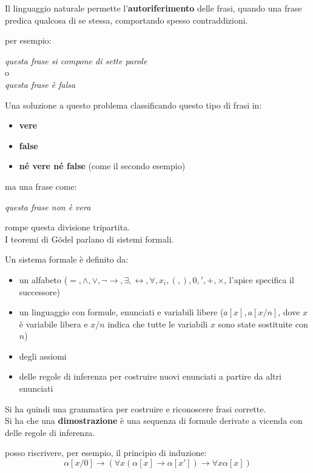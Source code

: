 \documentclass[a4paper,12pt, oneside]{book}
\begin{document}
Il linguaggio naturale permette l'\textbf{autoriferimento} delle frasi, quando
una frase predica qualcosa di se stessa, comportando spesso contraddizioni.
\begin{esempio}
  per esempio:
  \begin{center}
    \textit{questa frase si compone di sette parole}
    \\o\\
    \textit{questa frase è falsa}
  \end{center}
\end{esempio}
Una soluzione a questo problema classificando questo tipo di frasi in:
\begin{itemize}
  \item \textbf{vere}
  \item \textbf{false}
  \item \textbf{né vere né false} (come il secondo esempio)
\end{itemize}
ma una frase come:
\begin{center}
  \textit{questa frase non è vera}
\end{center}
rompe questa divisione tripartita. \\
I teoremi di G\"{o}del parlano di sistemi formali.
\begin{definizione}
  Un sistema formale è definito da:
  \begin{itemize}
    \item un alfabeto ($=,\land,\lor, \neg \to, \exists, \leftrightarrow,
    \forall, x_i, (,),0,',+,\times$, l'apice specifica il successore)
    \item un linguaggio con formule, enunciati e variabili libere ($a[x],
    a[x/n]$, dove $x$ è variabile libera e $x/n$ indica che tutte le variabili
    $x$ sono state sostituite con $n$) 
    \item degli assiomi
    \item delle regole di inferenza per costruire nuovi enunciati a partire da
    altri enunciati
  \end{itemize}
  Si ha quindi una grammatica per costruire e riconoscere frasi corrette.\\
  Si ha che una \textbf{dimostrazione} è una sequenza di formule derivate a
  vicenda con delle regole di inferenza.
  \begin{esempio}
    posso riscrivere, per esempio, il principio di induzione:
    \[\alpha[x/0]\to(\forall x(\alpha[x]\to \alpha[x'])\to \forall x\alpha[x])\]
  \end{esempio}  
\end{definizione}
\end{document}
